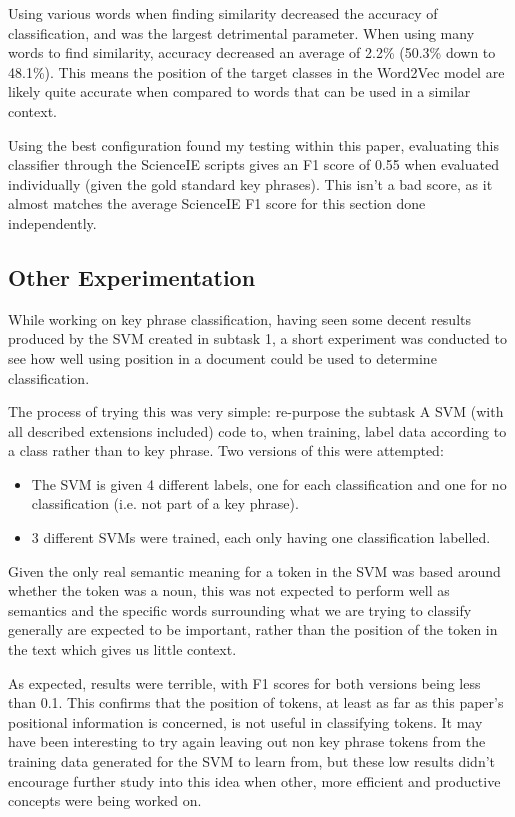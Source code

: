 Using various words when finding similarity decreased the accuracy of classification, and was the largest detrimental parameter. When using many words to find similarity, accuracy decreased an average of 2.2\% (50.3\% down to 48.1\%). This means the position of the target classes in the Word2Vec model are likely quite accurate when compared to words that can be used in a similar context.

Using the best configuration found my testing within this paper, evaluating this classifier through the ScienceIE scripts gives an F1 score of 0.55 when evaluated individually (given the gold standard key phrases). This isn't a bad score, as it almost matches the average ScienceIE F1 score for this section done independently.

\subsection*{Other Experimentation}
While working on key phrase classification, having seen some decent results produced by the SVM created in subtask 1, a short experiment was conducted to see how well using position in a document could be used to determine classification.

The process of trying this was very simple: re-purpose the subtask A SVM (with all described extensions included) code to, when training, label data according to a class rather than to key phrase. Two versions of this were attempted:

\begin{itemize}
	\item The SVM is given 4 different labels, one for each classification and one for no classification (i.e. not part of a key phrase).
	\item 3 different SVMs were trained, each only having one classification labelled.
\end{itemize}

Given the only real semantic meaning for a token in the SVM was based around whether the token was a noun, this was not expected to perform well as semantics and the specific words surrounding what we are trying to classify generally are expected to be important, rather than the position of the token in the text which gives us little context.

As expected, results were terrible, with F1 scores for both versions being less than 0.1. This confirms that the position of tokens, at least as far as this paper's positional information is concerned, is not useful in classifying tokens. It may have been interesting to try again leaving out non key phrase tokens from the training data generated for the SVM to learn from, but these low results didn't encourage further study into this idea when other, more efficient and productive concepts were being worked on.

